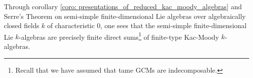             \begin{remark}
                Through corollary \ref{coro: presentations_of_reduced_kac_moody_algebras} and Serre's Theorem on semi-simple finite-dimensional Lie algebras over algebraically closed fields $k$ of characteristic $0$, one sees that the semi-simple finite-dimensional Lie $k$-algebras are precisely finite direct sums\footnote{Recall that we have assumed that tame GCMs are indecomposable.} of finite-type Kac-Moody $k$-algebras. 
            \end{remark}